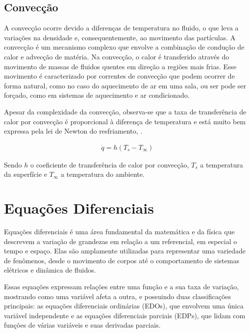 \subsection{Convecção}

A convecção ocorre devido a diferenças de temperatura no fluido, o que leva a variações na densidade e, consequentemente, ao movimento das partículas. A convecção é um mecanismo complexo que envolve a combinação de condução de calor e advecção de matéria. Na convecção, o calor é transferido através do movimento de massas de fluidos quentes em direção a regiões mais frias. Esse movimento é caracterizado por correntes de convecção que podem ocorrer de forma natural, como no caso do aquecimento de ar em uma sala, ou ser pode ser forçado, como em sistemas de aquecimento e ar condicionado.

Apesar da complexidade da convecção, observa-se que a taxa de transferência de calor por convecção é proporcional à diferença de temperatura e está muito bem expressa pela lei de Newton do resfriamento, \citet{cengel2010}.

\begin{gather}
    \dot{q} = h (T_s - T_{\infty})
\end{gather}

Sendo \(h\) o coeficiente de transferência de calor por convecção, \(T_s\) a temperatura da superfície e \(T_{\infty}\) a temperatura do ambiente.

\section{Equações Diferenciais}

Equações diferenciais é uma área fundamental da matemática e da física que descrevem a variação de grandezas em relação a um referencial, em especial o tempo e espaço. Elas são amplamente utilizadas para representar uma variedade de fenômenos, desde o movimento de corpos até o comportamento de sistemas elétricos e dinâmica de fluidos.

Essas equações expressam relações entre uma função e a sua taxa de variação, mostrando como uma variável afeta a outra, e possuindo duas classificações principais: as equações diferenciais ordinárias (EDOs), que envolvem uma única variável independente e as equações diferenciais parciais (EDPs), que lidam com funções de várias variáveis e suas derivadas parciais.

